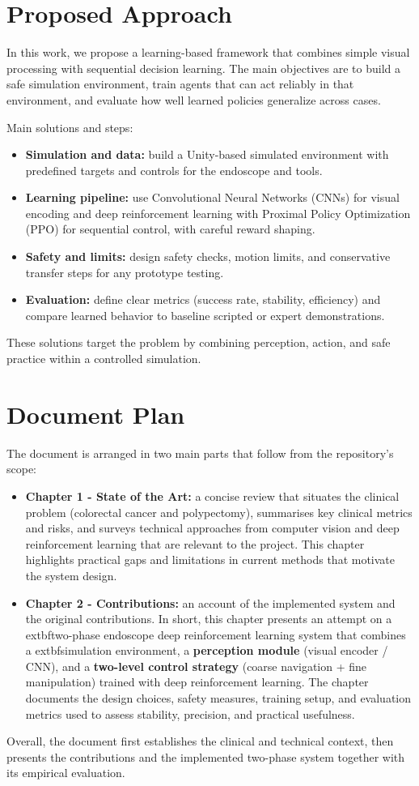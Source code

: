 \section*{Proposed Approach}
In this work, we propose a learning-based framework that combines simple visual
processing with sequential decision learning. The main objectives are to build a safe
simulation environment, train agents that can act reliably in that environment, and
evaluate how well learned policies generalize across cases.

Main solutions and steps:
\begin{itemize}
\item \textbf{Simulation and data:} build a Unity-based simulated environment with
predefined targets and controls for the endoscope and tools.
\item \textbf{Learning pipeline:} use Convolutional Neural Networks (CNNs) for visual encoding
and deep reinforcement learning with Proximal Policy Optimization (PPO) for sequential control, with careful reward shaping.
\item \textbf{Safety and limits:} design safety checks, motion limits, and conservative
transfer steps for any prototype testing.
\item \textbf{Evaluation:} define clear metrics (success rate, stability, efficiency) and
compare learned behavior to baseline scripted or expert demonstrations.
\end{itemize}

These solutions target the problem by combining perception, action, and safe practice
within a controlled simulation.

\section*{Document Plan}
The document is arranged in two main parts that follow from the repository's scope:

\begin{itemize}
\item \textbf{Chapter 1 - State of the Art:} a concise review that situates the
	clinical problem (colorectal cancer and polypectomy), summarises key clinical
	metrics and risks, and surveys technical approaches from computer vision and
	deep reinforcement learning that are relevant to the project. This chapter highlights
	practical gaps and limitations in current methods that motivate the system design.

\item \textbf{Chapter 2 - Contributions:} an account of the implemented system and
	the original contributions. In short, this chapter presents an attempt on a
		extbf{two-phase endoscope deep reinforcement learning system} that combines a
		extbf{simulation environment}, a \textbf{perception module} (visual encoder / CNN),
	and a \textbf{two-level control strategy} (coarse navigation + fine manipulation)
	trained with deep reinforcement learning. The chapter documents the design choices,
	safety measures, training setup, and evaluation metrics used to assess stability,
	precision, and practical usefulness.
\end{itemize}

Overall, the document first establishes the clinical and technical context, then
presents the contributions and the implemented two-phase system together with its
empirical evaluation.